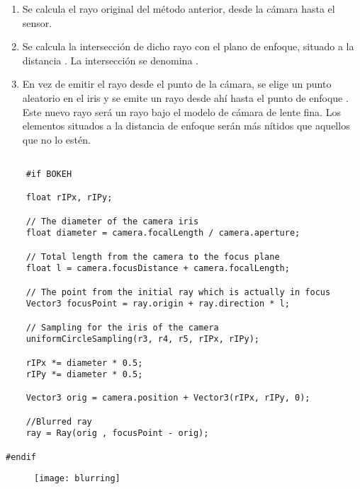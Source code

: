 \begin{enumerate}
		
\item Se calcula el rayo original del método anterior, desde la cámara hasta el sensor.
	
\item Se calcula la intersección de dicho rayo con el plano de enfoque, situado a la distancia . La intersección se denomina .
	
\item En vez de emitir el rayo desde el punto de la cámara, se elige un punto aleatorio en el iris  y se emite un rayo desde ahí hasta el punto de enfoque . Este nuevo rayo será un rayo bajo el modelo de cámara de lente fina. Los elementos situados a la distancia de enfoque  serán más nítidos que aquellos que no lo estén.
	
\end{enumerate}

\begin{lstlisting}
	
	#if BOKEH
	
    float rIPx, rIPy;

    // The diameter of the camera iris
    float diameter = camera.focalLength / camera.aperture;

    // Total length from the camera to the focus plane
    float l = camera.focusDistance + camera.focalLength;

    // The point from the initial ray which is actually in focus
    Vector3 focusPoint = ray.origin + ray.direction * l;

    // Sampling for the iris of the camera
    uniformCircleSampling(r3, r4, r5, rIPx, rIPy);

    rIPx *= diameter * 0.5;
    rIPy *= diameter * 0.5;

    Vector3 orig = camera.position + Vector3(rIPx, rIPy, 0);

    //Blurred ray
    ray = Ray(orig , focusPoint - orig);

#endif 

\end{lstlisting}

	\begin{figure}[H]
		\centering
		\texttt{[image: blurring]}
		\caption{}
		\label{fig:label}
	\end{figure}
	
